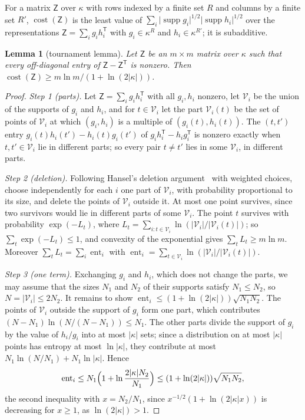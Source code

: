 \documentclass[11pt]{amsart}
\newtheorem{lemma}[theorem]{Lemma}
\theoremstyle{definition}
\theoremstyle{remark}
\numberwithin{equation}{section}
\newcommand{\abs}[1]{\lvert #1\rvert}
\theoremstyle{plain}
\theoremstyle{definition}
\theoremstyle{plain}
\begin{document}
For a matrix $\mathsf Z$ over $\kappa$ with rows indexed by a finite set $R$ and columns by a finite set $R'$,
$\operatorname{cost}(\mathsf Z)$ is the least value of
$\sum_i\abs{\operatorname{supp}g_i}^{1/2}\abs{\operatorname{supp}h_i}^{1/2}$ over the representations
$\mathsf Z=\sum_ig_ih_i^{\mathsf T}$ with $g_i\in\kappa^R$ and $h_i\in\kappa^{R'}$; it is subadditive.

\begin{lemma}[tournament lemma]\label{fib:lem:tournament}
Let $\mathsf Z$ be an $m\times m$ matrix over $\kappa$ such that every off-diagonal entry of $\mathsf Z-\mathsf Z^{\mathsf T}$ is nonzero. Then
$\operatorname{cost}(\mathsf Z)\ge m\ln m/(1+\ln(2\abs\kappa))$.
\end{lemma}

\begin{proof}
\emph{Step 1 (parts).} Let $\mathsf Z=\sum_ig_ih_i^{\mathsf T}$ with all $g_i,h_i$ nonzero, let $\mathcal V_i$ be the
union of the supports of $g_i$ and $h_i$, and for $t\in\mathcal V_i$ let the part $\mathcal V_i(t)$ be the set of points
of $\mathcal V_i$ at which $(g_i,h_i)$ is a multiple of $(g_i(t),h_i(t))$. The $(t,t')$ entry
$g_i(t)h_i(t')-h_i(t)g_i(t')$ of $g_ih_i^{\mathsf T}-h_ig_i^{\mathsf T}$ is nonzero exactly when $t,t'\in\mathcal V_i$ lie
in different parts; so every pair $t\ne t'$ lies in some $\mathcal V_i$, in different parts.

\emph{Step 2 (deletion).} Following Hansel's deletion argument~\cite{Ha} with weighted choices, choose independently
for each $i$ one part of $\mathcal V_i$, with probability proportional to its size, and delete the points of $\mathcal V_i$
outside it. At most one point survives, since two survivors would lie in different parts of some $\mathcal V_i$. The
point $t$ survives with probability $\exp(-L_t)$, where
$L_t=\sum_{i:t\in\mathcal V_i}\ln(\abs{\mathcal V_i}/\abs{\mathcal V_i(t)})$; so $\sum_t\exp(-L_t)\le1$, and convexity of
the exponential gives $\sum_tL_t\ge m\ln m$. Moreover $\sum_tL_t=\sum_i\operatorname{ent}_i$ with
$\operatorname{ent}_i=\sum_{t\in\mathcal V_i}\ln(\abs{\mathcal V_i}/\abs{\mathcal V_i(t)})$.

\emph{Step 3 (one term).} Exchanging $g_i$ and $h_i$, which does not change the parts, we may assume that the sizes
$N_1$ and $N_2$ of their supports satisfy $N_1\le N_2$, so $N=\abs{\mathcal V_i}\le2N_2$. It remains to show
$\operatorname{ent}_i\le(1+\ln(2\abs\kappa))\sqrt{N_1N_2}$. The points of $\mathcal V_i$ outside the support of $g_i$ form one
part, which contributes $(N-N_1)\ln(N/(N-N_1))\le N_1$. The other parts divide the support of $g_i$ by the value of
$h_i/g_i$ into at most $\abs\kappa$ sets; since a distribution on at most $\abs\kappa$ points has entropy at most
$\ln\abs\kappa$, they contribute at most $N_1\ln(N/N_1)+N_1\ln\abs\kappa$. Hence
\[
 \operatorname{ent}_i\le N_1\Bigl(1+\ln\frac{2\abs\kappa N_2}{N_1}\Bigr)\le(1+\ln(2\abs\kappa))\sqrt{N_1N_2},
\]
the second inequality with $x=N_2/N_1$, since $x^{-1/2}(1+\ln(2\abs\kappa x))$ is decreasing for $x\ge1$, as
$\ln(2\abs\kappa)>1$.
\end{proof}
\end{document}

